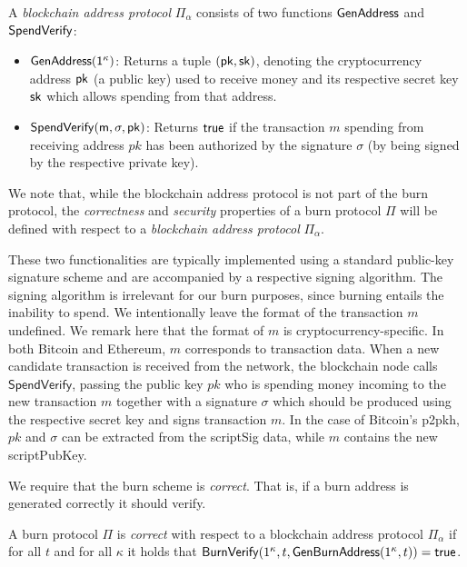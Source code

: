 \begin{definition}
  A \emph{blockchain address protocol} $\Pi_\alpha$ consists of two functions $\sf{GenAddress}$ and $\sf{SpendVerify}$:

  \begin{itemize}
    \item $\sf{GenAddress}(1^\kappa)$: Returns a tuple $(\sf{pk}, \sf{sk})$, denoting the cryptocurrency address $\sf{pk}$ (a public key) used to receive money and its respective secret key $\sf{sk}$ which allows spending from that address.

    \item $\sf{SpendVerify}(m, \sigma, pk)$: Returns $\sf{true}$ if the transaction $m$ spending from receiving address $pk$ has been authorized by the signature $\sigma$ (by being signed by the respective private key).
  \end{itemize}
\end{definition}

We note that, while the blockchain address protocol is not part of the burn protocol, the \emph{correctness} and \emph{security} properties of a burn protocol $\Pi$ will be defined with respect to a \emph{blockchain address protocol} $\Pi_\alpha$.

These two functionalities are typically implemented using a standard public-key signature scheme and are accompanied by a respective signing algorithm. The signing algorithm is irrelevant for our burn purposes, since burning entails the inability to spend. We intentionally leave the format of the transaction $m$ undefined. We remark here that the format of $m$ is cryptocurrency-specific. In both Bitcoin and Ethereum, $m$ corresponds to transaction data. When a new candidate transaction is received from the network, the blockchain node calls $\textsf{SpendVerify}$, passing the public key $pk$ who is spending money incoming to the new transaction $m$ together with a signature $\sigma$ which should be produced using the respective secret key and signs transaction $m$. In the case of Bitcoin's p2pkh, $pk$ and $\sigma$ can be extracted from the scriptSig data, while $m$ contains the new scriptPubKey.

We require that the burn scheme is \emph{correct}. That is, if a burn address is generated correctly it should verify.

\begin{definition}[Correctness]
  A burn protocol $\Pi$ is \emph{correct} with respect to a blockchain address protocol $\Pi_\alpha$ if for all $t$ and for all $\kappa$ it holds that
  $\mathsf{BurnVerify}(1^\kappa, t, \mathsf{GenBurnAddress}(1^\kappa, t)) = \textsf{true}$.
\end{definition}

